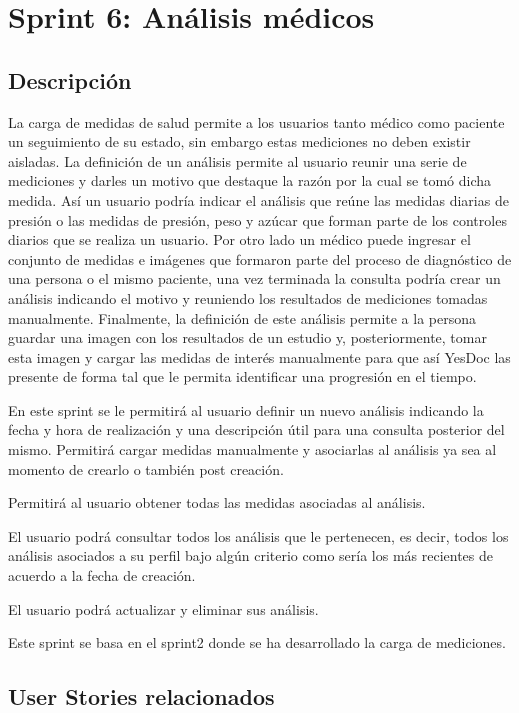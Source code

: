 \section{Sprint 6: Análisis médicos} %


\subsection{Descripción}

La carga de medidas de salud permite a los usuarios tanto médico como paciente un seguimiento de su estado, sin embargo estas mediciones no deben existir aisladas. La definición de un análisis permite al usuario reunir una serie de mediciones y darles un motivo que destaque la razón por la cual se tomó dicha medida. Así un usuario podría indicar el análisis que reúne las medidas diarias de presión o las medidas de presión, peso y azúcar que forman parte de los controles diarios que se realiza un usuario. Por otro lado un médico puede ingresar el conjunto de medidas e imágenes que formaron parte del proceso de diagnóstico de una persona o el mismo paciente, una vez terminada la consulta podría crear un análisis indicando el motivo y reuniendo los resultados de mediciones tomadas manualmente. Finalmente, la definición de este análisis permite a la persona guardar una imagen con los resultados de un estudio y, posteriormente, tomar esta imagen y cargar las medidas de interés manualmente para que así YesDoc las presente de forma tal que le permita identificar una progresión en el tiempo.

En este sprint se le permitirá al usuario definir un nuevo análisis indicando la fecha y hora de realización y una descripción útil para una consulta posterior del mismo. Permitirá cargar medidas manualmente y asociarlas al análisis ya sea al momento de crearlo o también post creación.

Permitirá al usuario obtener todas las medidas asociadas al análisis.

El usuario podrá consultar todos los análisis que le pertenecen, es decir, todos los análisis asociados a su perfil bajo algún criterio como sería los más recientes de acuerdo a la fecha de creación. 

El usuario podrá actualizar y eliminar sus análisis.

Este sprint se basa en el sprint2 donde se ha desarrollado la carga de mediciones.


\subsection{User Stories relacionados}

